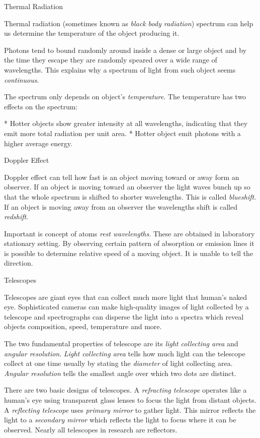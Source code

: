 \sec Thermal Radiation

Thermal radiation (sometimes known as {\em black body radiation}) spectrum can
help us determine the temperature of the object producing it.

Photons tend to bound randomly around inside a dense or large object and by
the time they escape they are randomly speared over a wide range of wavelengths.
This explains why a spectrum of light from such object seems {\em continuous}.

The spectrum only depends on object's {\em temperature}. The temperature has
two effects on the spectrum:

\begitems
* Hotter objects show greater intensity at all wavelengths, indicating that
they emit more total radiation per unit area.
* Hotter object emit photons with a higher average energy.
\enditems

\sec Doppler Effect

Doppler effect can tell how fast is an object moving toward or away form
an observer. If an object is moving toward an observer the light waves bunch
up so that the whole spectrum is shifted to shorter wavelengths. This is called
{\em blueshift}. If an object is moving away from an observer the wavelengths
shift is called {\em redshift}.

Important is concept of atoms {\em rest wavelengths}. These are obtained
in laboratory stationary setting. By observing certain pattern of absorption
or emission lines it is possible to determine relative speed of a moving
object. It is unable to tell the direction.

\sec Telescopes

Telescopes are giant eyes that can collect much more light that human's naked
eye. Sophisticated cameras can make high-quality images of light collected
by a telescope and spectrographs can disperse the light into a spectra which
reveal objects composition, speed, temperature and more.

The two fundamental properties of telescope are its {\em light collecting area}
and {\em angular resolution}. {\em Light collecting area} tells how much light
can the telescope collect at one time usually by stating the {\em diameter} of
light collecting area. {\em Angular resolution} tells the smallest angle over
which two dots are distinct.

There are two basic designs of telescopes. A {\em refracting telescope}
operates like a human's eye using transparent glass lenses to focus the light
from distant objects. A {\em reflecting telescope} uses {\em primary mirror} to
gather light. This mirror reflects the light to a {\em secondary mirror} which
reflects the light to focus where it can be observed. Nearly all telescopes
in research are reflectors.

